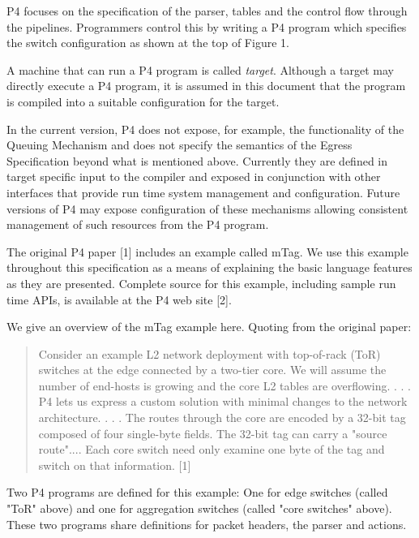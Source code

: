 \documentclass[12pt]{article}
\begin{document}
P4 focuses on the specification of the parser, \matchaction tables and the 
control flow through the pipelines. Programmers control this by writing a 
P4 program which specifies the switch configuration as shown at the top of 
Figure 1. 

A machine that can run a P4 program is called \textit{target}. Although a target 
may directly execute a P4 program, it is assumed in this document that the 
program is compiled into a suitable configuration for the target.

In the current version, P4 does not expose, for example, the functionality 
of the Queuing Mechanism and does not specify the semantics of the Egress 
Specification beyond what is mentioned above. Currently they are defined in 
target specific input to the compiler and exposed in conjunction with other 
interfaces that provide run time system management and configuration. Future 
versions of P4 may expose configuration of these mechanisms allowing consistent 
management of such resources from the P4 program.


The original P4 paper [1] includes an example called mTag. We use this example 
throughout this specification as a means of explaining the basic language 
features as they are presented. Complete source for this example, including 
sample run time APIs, is available at the P4 web site [2].

We give an overview of the mTag example here.  Quoting from the original paper:

\begin{quote}
Consider an example L2 network deployment with top-of-rack (ToR) switches 
at the edge connected by a two-tier core. We will assume the number of end-hosts 
is growing and the core L2 tables are overflowing. . . .  P4 lets us express a 
custom solution with minimal changes to the network architecture. . . . The routes 
through the core are encoded by a 32-bit tag composed of four single-byte 
fields.  The 32-bit tag can carry a "source route".... Each core switch need 
only examine one byte of the tag and switch on that information. [1]
\end{quote}

Two P4 programs are defined for this example: One for edge switches (called 
"ToR" above) and one for aggregation switches (called "core switches" above). 
These two programs share definitions for packet headers, the parser and actions.

\end{document}
